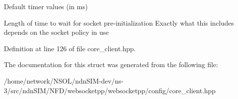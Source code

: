 Default timer values (in ms) 

Length of time to wait for socket pre-\/initialization Exactly what this includes depends on the socket policy in use 

Definition at line 126 of file core\+\_\+client.\+hpp.



The documentation for this struct was generated from the following file\+:\begin{DoxyCompactItemize}
\item 
/home/network/\+N\+S\+O\+L/ndn\+S\+I\+M-\/dev/ns-\/3/src/ndn\+S\+I\+M/\+N\+F\+D/websocketpp/websocketpp/config/core\+\_\+client.\+hpp\end{DoxyCompactItemize}
